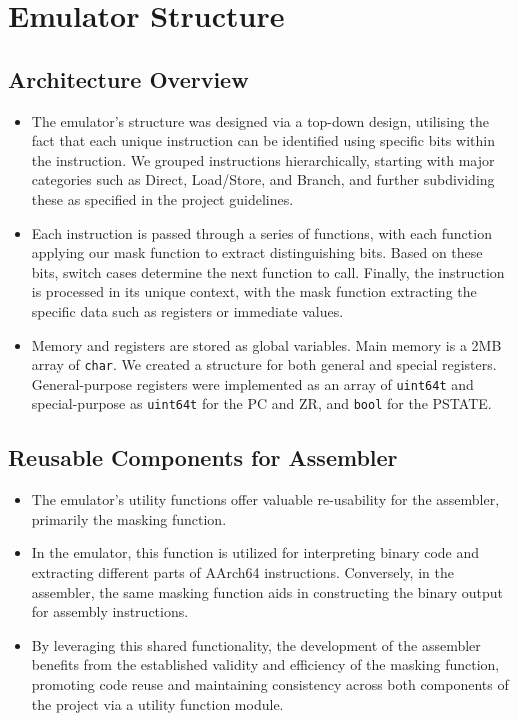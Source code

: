 \documentclass{article}
\begin{document}
\newpage
\section{Emulator Structure}
\label{sec:emulator_structure}
\subsection{Architecture Overview}
\begin{itemize}
    \item The emulator's structure was designed via a top-down design, utilising the fact that each unique instruction can be identified using specific bits within the instruction. We grouped instructions hierarchically, starting with major categories such as Direct, Load/Store, and Branch, and further subdividing these as specified in the project guidelines.
    \item Each instruction is passed through a series of functions, with each function applying our mask function to extract distinguishing bits. Based on these bits, switch cases determine the next function to call. Finally, the instruction is processed in its unique context, with the mask function extracting the specific data such as registers or immediate values.
    \item Memory and registers are stored as global variables. Main memory is a 2MB array of \texttt{char}. We created a structure for both general and special registers. General-purpose registers were implemented as an array of \texttt{uint64\textunderscore t} and special-purpose as \texttt{uint64\textunderscore t} for the PC and ZR, and \texttt{bool} for the PSTATE.
\end{itemize}



\subsection{Reusable Components for Assembler}
\begin{itemize}
    \item The emulator's utility functions offer valuable re-usability for the assembler, primarily the masking function.
    \item In the emulator, this function is utilized for interpreting binary code and extracting different parts of AArch64 instructions. Conversely, in the assembler, the same masking function aids in constructing the binary output for assembly instructions.
    \item By leveraging this shared functionality, the development of the assembler benefits from the established validity and efficiency of the masking function, promoting code reuse and maintaining consistency across both components of the project via a utility function module.
\end{itemize}
\end{document}
